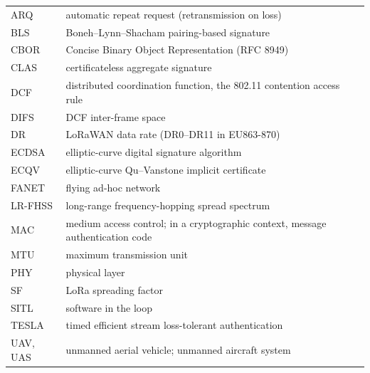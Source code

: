 {\small
\noindent\begin{tabularx}{\textwidth}{@{}l Y@{}}
\toprule
ARQ & automatic repeat request (retransmission on loss) \\
BLS & Boneh--Lynn--Shacham pairing-based signature \\
CBOR & Concise Binary Object Representation (RFC 8949) \\
CLAS & certificateless aggregate signature \\
DCF & distributed coordination function, the 802.11 contention access rule \\
DIFS & DCF inter-frame space \\
DR & LoRaWAN data rate (DR0--DR11 in EU863-870) \\
ECDSA & elliptic-curve digital signature algorithm \\
ECQV & elliptic-curve Qu--Vanstone implicit certificate \\
FANET & flying ad-hoc network \\
LR-FHSS & long-range frequency-hopping spread spectrum \\
MAC & medium access control; in a cryptographic context, message authentication code \\
MTU & maximum transmission unit \\
PHY & physical layer \\
SF & LoRa spreading factor \\
SITL & software in the loop \\
TESLA & timed efficient stream loss-tolerant authentication \\
UAV, UAS & unmanned aerial vehicle; unmanned aircraft system \\
\bottomrule
\end{tabularx}
}
